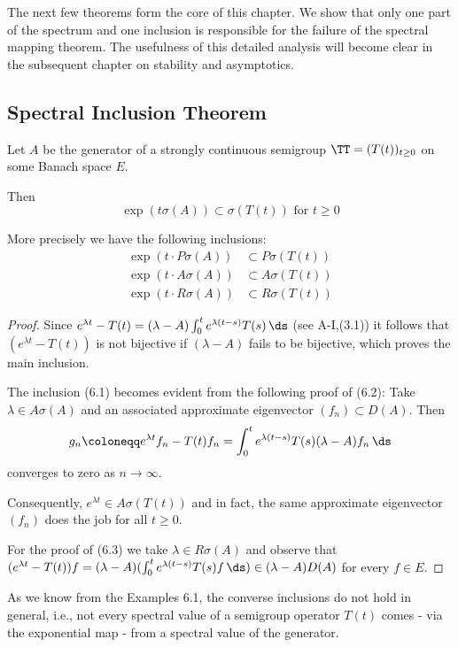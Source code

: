 The next few theorems form the core of this chapter. We show that only one part of the spectrum and one inclusion is responsible for the failure of the spectral mapping theorem.
The usefulness of this detailed analysis will become clear in the subsequent chapter on stability and asymptotics.

\subsection{Spectral Inclusion Theorem}\label{subsec:a3-6.2}
Let $A$ be the generator of a strongly continuous semigroup $\TT = (T(t))_{t \geq 0}$ on some Banach space $E$.

Then
\[
\exp(t\sigma(A)) \subset \sigma(T(t)) \text{ for } t \geq 0
\]

More precisely we have the following inclusions:
\begin{align}
\exp(t \cdot P\sigma(A)) &\subset P\sigma(T(t)) \label{eq:a3-6.1} \\
\exp(t \cdot A\sigma(A)) &\subset A\sigma(T(t)) \label{eq:a3-6.2} \\
\exp(t \cdot R\sigma(A)) &\subset R\sigma(T(t)) \label{eq:a3-6.3}
\end{align}
\begin{proof}
Since $e^{\lambda t} - T(t) = (\lambda - A)\int_{0}^{t} e^{\lambda(t-s)}T(s) \, \ds$ (see A-I,(3.1)) it follows that $(e^{\lambda t} - T(t))$ is not bijective if $(\lambda - A)$ fails to be bijective, which proves the main inclusion.

The inclusion (6.1) becomes evident from the following proof of (6.2): Take $\lambda \in A\sigma(A)$ and an associated approximate eigenvector $(f_{n}) \subset D(A)$.
Then
\[
g_{n} \coloneqq e^{\lambda t}f_{n} - T(t)f_{n} = \int_{0}^{t} e^{\lambda(t-s)}T(s)(\lambda-A)f_{n} \, \ds
\]
converges to zero as $n \to \infty$.

Consequently, $e^{\lambda t} \in A\sigma(T(t))$ and in fact, the same approximate eigenvector $(f_{n})$ does the job for all $t \geq 0$.

For the proof of (6.3) we take $\lambda \in R\sigma(A)$ and observe that $(e^{\lambda t} - T(t))f = (\lambda - A)(\int_{0}^{t} e^{\lambda(t-s)}T(s)f \, \ds) \in (\lambda - A)D(A)$ for every $f \in E$.
\end{proof}
\newpage
As we know from the Examples 6.1, the converse inclusions do not hold in general, i.e., not every spectral value of a semigroup operator $T(t)$ comes - via the exponential map - from a spectral value of the generator.
